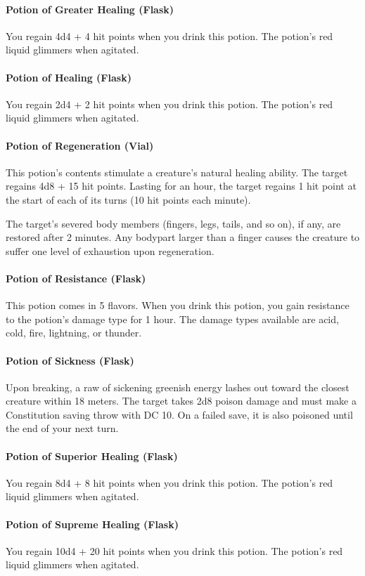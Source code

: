 \paragraph{Potion of Greater Healing (Flask)}
    You regain 4d4 + 4 hit points when you drink this potion.
    The potion's red liquid glimmers when agitated.
\paragraph{Potion of Healing (Flask)}
    You regain 2d4 + 2 hit points when you drink this potion.
    The potion's red liquid glimmers when agitated.
\paragraph{Potion of Regeneration (Vial)} %
    This potion's contents stimulate a creature's natural healing ability.
    The target regains 4d8 + 15 hit points.
    Lasting for an hour, the target regains 1 hit point at the start of each of its turns (10 hit points each minute).

    The target's severed body members (fingers, legs, tails, and so on), if any, are restored after 2 minutes.
    Any bodypart larger than a finger causes the creature to suffer one level of exhaustion upon regeneration.
\paragraph{Potion of Resistance (Flask)}
    This potion comes in 5 flavors.
    When you drink this potion, you gain resistance to the potion's damage type for 1 hour.
    The damage types available are acid, cold, fire, lightning, or thunder.
\paragraph{Potion of Sickness (Flask)} %
    Upon breaking, a raw of sickening greenish energy lashes out toward the closest creature within 18 meters.
    The target takes 2d8 poison damage and must make a Constitution saving throw with DC 10.
    On a failed save, it is also poisoned until the end of your next turn.
\paragraph{Potion of Superior Healing (Flask)}
    You regain 8d4 + 8 hit points when you drink this potion. The potion's red liquid glimmers when agitated.
\paragraph{Potion of Supreme Healing (Flask)}
    You regain 10d4 + 20 hit points when you drink this potion.
    The potion's red liquid glimmers when agitated.
